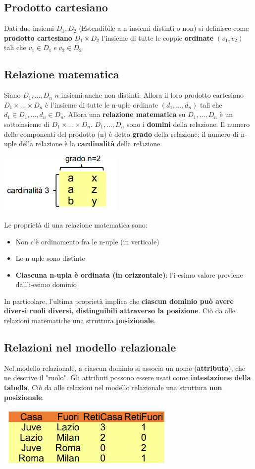 \documentclass[12pt]{article}
\begin{document}
\subsection{Prodotto cartesiano}
Dati due insiemi $D_1, D_2$ (Estendibile a n insiemi distinti o non)
si definisce come \textbf{prodotto cartesiano} $D_1 \times D_2$ l'insieme di tutte le coppie \textbf{ordinate} $(v_1, v_2)$ tali che $v_1 \in D_1 \; e \; v_2 \in D_2$.
\subsection{Relazione matematica}
Siano $D_1, \dots, D_n$ $n$ insiemi anche non distinti.
Allora il loro prodotto cartesiano $D_1 \times \dots \times D_n$ è l'insieme di tutte le n-uple ordinate $(d_1, \dots, d_n)$ tali che
$d_1 \in D_1, \dots , d_n \in D_n$.
Allora una \textbf{relazione matematica} su $D_1,\dots,D_n$ è un sottoinsieme di $D_1 \times \dots \times D_n$.
$D_1, \dots, D_n$ sono i \textbf{domini} della relazione.
Il numero delle componenti del prodotto (n) è detto \textbf{grado} della relazione; il numero di n-uple della relazione è la \textbf{cardinalità} della relazione.
\begin{center}
    \includegraphics[width = 0.45\textwidth]{Images/76.PNG}
\end{center}
Le proprietà di una relazione matematica sono:
\begin{itemize}
    \item Non c'è ordinamento fra le n-uple (in verticale)
    \item Le n-uple sono distinte
    \item \textbf{Ciascuna n-upla è ordinata (in orizzontale)}: l'i-esimo valore proviene dall'i-esimo dominio
\end{itemize}
In particolare, l'ultima proprietà implica che \textbf{ciascun dominio può avere diversi ruoli diversi, distinguibili attraverso la posizione}.
Ciò da alle relazioni matematiche una struttura \textbf{posizionale}.
\subsection{Relazioni nel modello relazionale}
Nel modello relazionale, a ciascun dominio si associa un nome (\textbf{attributo}), che ne descrive il "ruolo".
Gli attributi possono essere usati come \textbf{intestazione della tabella}.
Ciò da alle relazioni nel modello relazionale una struttura \textbf{non posizionale}.
\begin{center}
    \includegraphics[width = 0.65\textwidth]{Images/77.PNG}
\end{center}
\end{document}
